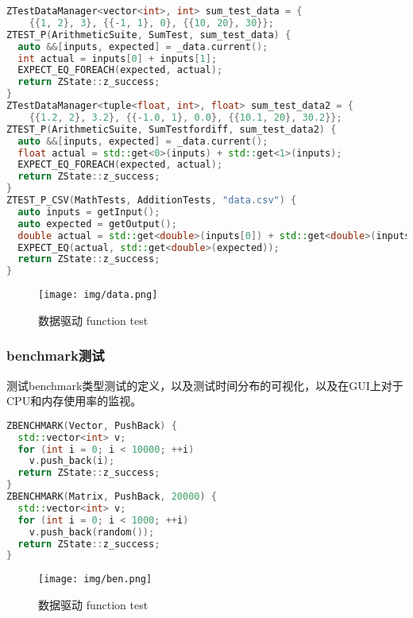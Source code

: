 \documentclass{article}
\begin{document}
\begin{framed}
    \begin{lstlisting}[language=C++]
ZTestDataManager<vector<int>, int> sum_test_data = {
    {{1, 2}, 3}, {{-1, 1}, 0}, {{10, 20}, 30}};
ZTEST_P(ArithmeticSuite, SumTest, sum_test_data) {
  auto &&[inputs, expected] = _data.current();
  int actual = inputs[0] + inputs[1];
  EXPECT_EQ_FOREACH(expected, actual);
  return ZState::z_success;
}
ZTestDataManager<tuple<float, int>, float> sum_test_data2 = {
    {{1.2, 2}, 3.2}, {{-1.0, 1}, 0.0}, {{10.1, 20}, 30.2}};
ZTEST_P(ArithmeticSuite, SumTestfordiff, sum_test_data2) {
  auto &&[inputs, expected] = _data.current();
  float actual = std::get<0>(inputs) + std::get<1>(inputs);
  EXPECT_EQ_FOREACH(expected, actual);
  return ZState::z_success;
}
ZTEST_P_CSV(MathTests, AdditionTests, "data.csv") {
  auto inputs = getInput();
  auto expected = getOutput();
  double actual = std::get<double>(inputs[0]) + std::get<double>(inputs[1]);
  EXPECT_EQ(actual, std::get<double>(expected));
  return ZState::z_success;
}
\end{lstlisting}
\end{framed}
\begin{figure}[H]
    \centering
    \texttt{[image: img/data.png]}
    \caption{数据驱动 function test}
    \label{fig: 数据驱动 function test}
\end{figure}
\subsubsection{benchmark测试}
测试benchmark类型测试的定义，以及测试时间分布的可视化，以及在GUI上对于CPU和内存使用率的监视。

\begin{framed}

    \begin{lstlisting}[language=C++]
ZBENCHMARK(Vector, PushBack) {
  std::vector<int> v;
  for (int i = 0; i < 10000; ++i)
    v.push_back(i);
  return ZState::z_success;
}
ZBENCHMARK(Matrix, PushBack, 20000) {
  std::vector<int> v;
  for (int i = 0; i < 1000; ++i)
    v.push_back(random());
  return ZState::z_success;
}\end{lstlisting}
\end{framed}
\begin{figure}[H]
    \centering
    \texttt{[image: img/ben.png]}
    \caption{数据驱动 function test}
    \label{fig: 数据驱动 function test}
\end{figure}
\end{document}
